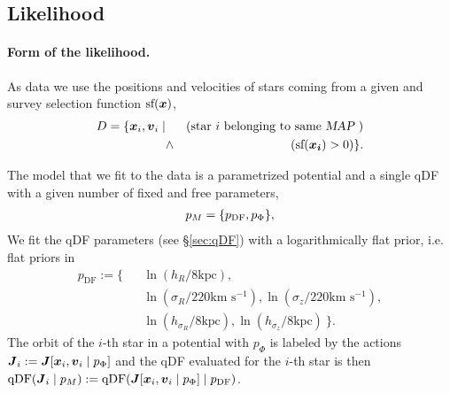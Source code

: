 \subsection{Likelihood} \label{sec:likelihood}

\paragraph{Form of the likelihood.}  As data we use the positions and velocities of stars coming from a given \MAP and survey selection function $\text{sf}(\boldsymbol{x})$,
\begin{eqnarray*}
D  =\{ \boldsymbol{x}_i,\boldsymbol{v}_i \mid && \text{(star $i$ belonging to same {\sl MAP}~)}\nonumber\\
&\wedge& (\text{sf}(\boldsymbol{x_i}) > 0) \}.
\end{eqnarray*}

The model that we fit to the data is a parametrized potential and a single qDF with a given number of fixed and free parameters,
\begin{eqnarray*}
p_M =\{ p_\text{DF} , p_\Phi \},
\end{eqnarray*}
We fit the qDF parameters (see \S\ref{sec:qDF}) with a logarithmically flat prior, i.e. flat priors in
\begin{eqnarray*}
p_\text{DF} := \{&& \ln \left(h_R/8\text{kpc}\right), \\
&& \ln \left(\sigma_R/220\text{km s$^{-1}$}\right), \ln \left(\sigma_z/220\text{km s$^{-1}$}\right), \\
&& \ln \left(h_{\sigma_R}/8\text{kpc}\right), \ln \left(h_{\sigma_z}/8\text{kpc}\right)\ \}.
\end{eqnarray*}
The orbit of the $i$-th star in a potential with $p_\Phi$ is labeled by the actions $\boldsymbol{J}_i := \boldsymbol{J}[\boldsymbol{x}_i,\boldsymbol{v}_i\mid p_{\Phi}]$ and the qDF evaluated for the $i$-th star is then $\text{qDF}(\boldsymbol{J}_i \mid p_M) := \text{qDF}(\boldsymbol{J}[\boldsymbol{x}_i,\boldsymbol{v}_i\mid p_{\Phi}] \mid p_\text{DF})$.

